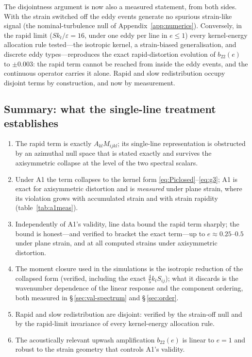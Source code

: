 \documentclass[lineno]{JFM-FLM_Au}
\begin{document}
The disjointness argument is now also a measured statement, from both
sides. With the strain switched off the eddy events generate no spurious
strain-like signal (the nominal-turbulence null of
Appendix~\ref{app:numerics}). Conversely, in the rapid limit
($Sk_t/\varepsilon=16$, under one eddy per line in $e\le1$) every
kernel-energy allocation rule tested---the isotropic kernel, a
strain-biased generalisation, and discrete eddy types---reproduces the
exact rapid-distortion evolution of $b_{22}(e)$ to $\pm0.003$: the rapid
term cannot be reached from inside the eddy events, and the continuous
operator carries it alone. Rapid and slow redistribution occupy disjoint
terms by construction, and now by measurement.

\subsection{Summary: what the single-line treatment establishes}
\label{sec:gate-summary}

\begin{enumerate}
\item The rapid term is exactly $A_{kl}M_{ijkl}$; its single-line
  representation is obstructed by an azimuthal null space that is stated
  exactly and survives the axisymmetric collapse at the level of the two
  spectral scalars.
\item Under A1 the term collapses to the kernel form
  \eqref{eq:Piclosed}--\eqref{eq:g3}; A1 is exact for axisymmetric
  distortion and is \emph{measured} under plane strain, where its violation
  grows with accumulated strain and with strain rapidity
  (table~\ref{tab:a1meas}).
\item Independently of A1's validity, line data bound the rapid term
  sharply; the bound is honest---and verified to bracket the exact
  term---up to $e\approx0.25$--$0.5$ under plane strain, and at all
  computed strains under axisymmetric distortion.
\item The moment closure used in the simulations is the isotropic reduction
  of the collapsed form (verified, including the exact
  $\tfrac45k_tS_{ij}$); what it discards is the wavenumber dependence of
  the linear response and the component ordering, both measured in
  \S\,\ref{sec:val-spectrum} and \S\,\ref{sec:order}.
\item Rapid and slow redistribution are disjoint: verified by the
  strain-off null and by the rapid-limit invariance of every kernel-energy
  allocation rule.
\item The acoustically relevant upwash amplification $b_{22}(e)$ is linear
  to $e=1$ and robust to the strain geometry that controls A1's validity.
\end{enumerate}
\end{document}
